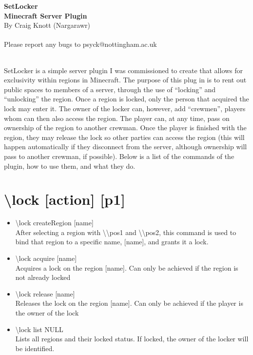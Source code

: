 \documentclass[a4paper,twoside,notitlepage,11pt]{article}
\newcommand{\nin}{\noindent}
\begin{document}
\begin{center}
   \textbf{SetLocker\ \\Minecraft Server Plugin} \ \\
   By Craig Knott (Nargarawr) \ \\
   \ \\
   Please report any bugs to psyck@nottingham.ac.uk
\end{center}
\ \\
\nin
SetLocker is a simple server plugin I was commissioned to create that allows for exclusivity within regions in Minecraft. The purpose of this plug in is to rent out public spaces to members of a server, through the use of ``locking'' and ``unlocking'' the region. Once a region is locked, only the person that acquired the lock may enter it. The owner of the locker can, however, add ``crewmen'', players whom can then also access the region. The player can, at any time, pass on ownership of the region to another crewman. Once the player is finished with the region, they may release the lock so other parties can access the region (this will happen automatically if they disconnect from the server, although ownership will pass to another crewman, if possible). Below is a list of the commands of the plugin, how to use them, and what they do.

\section{\textbackslash lock [action] [p1]}
\begin{itemize}
\item \textbackslash lock createRegion [name]\\
After selecting a region with \textbackslash\textbackslash pos1 and \textbackslash\textbackslash pos2, this command is used to bind that region to a specific name, [name], and grants it a lock.
\item \textbackslash lock acquire [name]\\
Acquires a lock on the region [name]. Can only be achieved if the region is not already locked
\item \textbackslash lock release [name]\\
Releases the lock on the region [name]. Can only be achieved if the player is the owner of the lock
\item \textbackslash lock list NULL\\
Lists all regions and their locked status. If locked, the owner of the locker will be identified.
\end{itemize}
\end{document}
